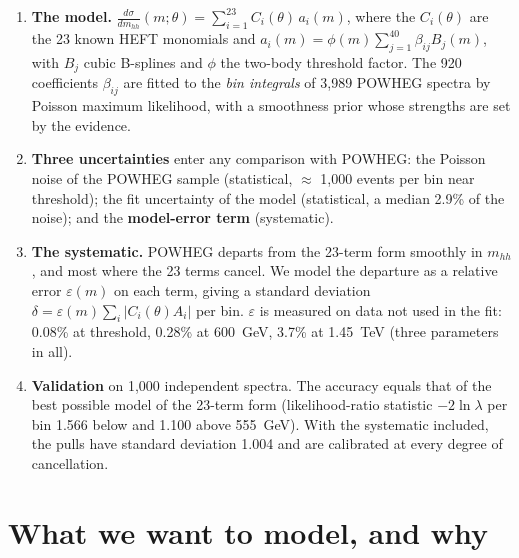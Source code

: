\documentclass[11pt]{article}
\newcommand{\mhh}{m_{hh}}
\begin{document}
\begin{keyidea}[In brief]
\begin{enumerate}
  \item \textbf{The model.} $\displaystyle \frac{d\sigma}{d\mhh}(m;\theta) =
    \sum_{i=1}^{23} C_i(\theta)\,a_i(m)$, where the $C_i(\theta)$ are the 23 known HEFT
    monomials and $a_i(m) = \phi(m)\sum_{j=1}^{40}\beta_{ij}B_j(m)$, with $B_j$ cubic
    B-splines and $\phi$ the two-body threshold factor. The 920 coefficients $\beta_{ij}$ are
    fitted to the \emph{bin integrals} of 3,989 POWHEG spectra by Poisson maximum likelihood,
    with a smoothness prior whose strengths are set by the evidence.
  \item \textbf{Three uncertainties} enter any comparison with POWHEG: the Poisson noise of
    the POWHEG sample (statistical, $\approx$ 1,000 events per bin near threshold); the fit
    uncertainty of the model (statistical, a median 2.9\% of the noise); and the
    \textbf{model-error term} (systematic).
  \item \textbf{The systematic.} POWHEG departs from the 23-term form smoothly in $\mhh$, and
    most where the 23 terms cancel. We model the departure as a relative error $\varepsilon(m)$
    on each term, giving a standard deviation $\delta = \varepsilon(m)\sum_i|C_i(\theta)A_i|$
    per bin. $\varepsilon$ is measured on data not used in the fit: 0.08\% at threshold,
    0.28\% at 600~GeV, 3.7\% at 1.45~TeV (three parameters in all).
  \item \textbf{Validation} on 1,000 independent spectra. The accuracy equals that of the
    best possible model of the 23-term form (likelihood-ratio statistic $-2\ln\lambda$ per bin
    1.566 below and 1.100 above 555~GeV). With the systematic included, the pulls have
    standard deviation 1.004 and are calibrated at every degree of cancellation.
\end{enumerate}
\end{keyidea}

\tableofcontents

\section{What we want to model, and why}
\label{sec:goal}
\end{document}
